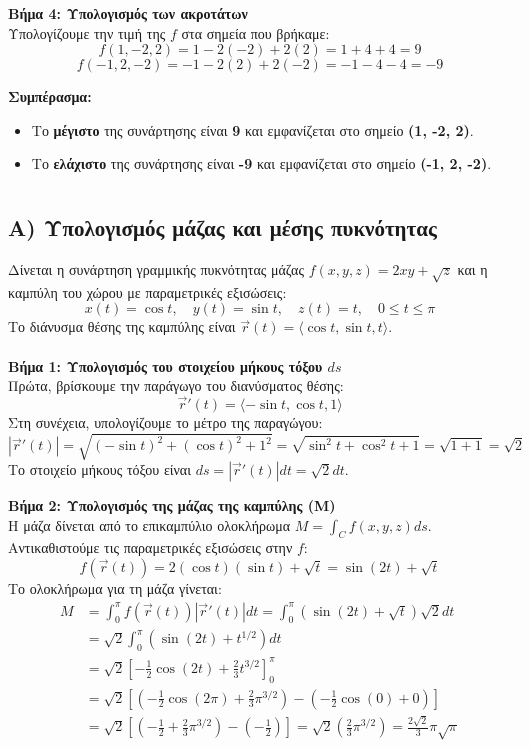 \documentclass[a4paper,12pt,twoside]{article}
\newcommand{\kerkissans}[1]{{\fontfamily{maksf}\selectfont {#1}}}
\begin{document}
\noindent
\textbf{Βήμα 4: Υπολογισμός των ακροτάτων}\\
\noindent
Υπολογίζουμε την τιμή της $f$ στα σημεία που βρήκαμε:
\[
f(1, -2, 2) = 1 - 2(-2) + 2(2) = 1 + 4 + 4 = 9
\]
\[
f(-1, 2, -2) = -1 - 2(2) + 2(-2) = -1 - 4 - 4 = -9
\]

\noindent
\textbf{Συμπέρασμα:}
\begin{itemize}
    \item Το \textbf{μέγιστο} της συνάρτησης είναι \textbf{9} και εμφανίζεται στο σημείο \textbf{(1, -2, 2)}.
    \item Το \textbf{ελάχιστο} της συνάρτησης είναι \textbf{-9} και εμφανίζεται στο σημείο \textbf{(-1, 2, -2)}.
\end{itemize}

\section*{\kerkissans{ΘΕΜΑ 3: Υπολογισμός Μάζας Καμπύλης και Διπλού Ολοκληρώματος}}

\subsection*{A) Υπολογισμός μάζας και μέσης πυκνότητας}
\noindent
Δίνεται η συνάρτηση γραμμικής πυκνότητας μάζας $f(x, y, z) = 2xy + \sqrt{z}$ και η καμπύλη του χώρου με παραμετρικές εξισώσεις:
\[ x(t) = \cos t, \quad y(t) = \sin t, \quad z(t) = t, \quad 0 \le t \le \pi \]
Το διάνυσμα θέσης της καμπύλης είναι $\vec{r}(t) = \langle \cos t, \sin t, t \rangle$.\\\\
\noindent
\textbf{Βήμα 1: Υπολογισμός του στοιχείου μήκους τόξου $ds$}\\
\noindent
Πρώτα, βρίσκουμε την παράγωγο του διανύσματος θέσης:
\[ \vec{r}'(t) = \langle -\sin t, \cos t, 1 \rangle \]
Στη συνέχεια, υπολογίζουμε το μέτρο της παραγώγου:
\[ |\vec{r}'(t)| = \sqrt{(-\sin t)^2 + (\cos t)^2 + 1^2} = \sqrt{\sin^2 t + \cos^2 t + 1} = \sqrt{1 + 1} = \sqrt{2} \]
Το στοιχείο μήκους τόξου είναι $ds = |\vec{r}'(t)| dt = \sqrt{2} dt$.

\noindent
\textbf{Βήμα 2: Υπολογισμός της μάζας της καμπύλης (M)}\\
\noindent
Η μάζα δίνεται από το επικαμπύλιο ολοκλήρωμα $M = \int_C f(x, y, z) ds$. Αντικαθιστούμε τις παραμετρικές εξισώσεις στην $f$:
\[ f(\vec{r}(t)) = 2(\cos t)(\sin t) + \sqrt{t} = \sin(2t) + \sqrt{t} \]
Το ολοκλήρωμα για τη μάζα γίνεται:
\begin{align*}
M &= \int_0^\pi f(\vec{r}(t)) |\vec{r}'(t)| dt = \int_0^\pi (\sin(2t) + \sqrt{t}) \sqrt{2} dt \\
&= \sqrt{2} \int_0^\pi (\sin(2t) + t^{1/2}) dt \\
&= \sqrt{2} \left[ -\frac{1}{2}\cos(2t) + \frac{2}{3}t^{3/2} \right]_0^\pi \\
&= \sqrt{2} \left[ \left(-\frac{1}{2}\cos(2\pi) + \frac{2}{3}\pi^{3/2}\right) - \left(-\frac{1}{2}\cos(0) + 0\right) \right] \\
&= \sqrt{2} \left[ \left(-\frac{1}{2} + \frac{2}{3}\pi^{3/2}\right) - \left(-\frac{1}{2}\right) \right] = \sqrt{2} \left(\frac{2}{3}\pi^{3/2}\right) = \frac{2\sqrt{2}}{3}\pi\sqrt{\pi}
\end{align*}
\end{document}

